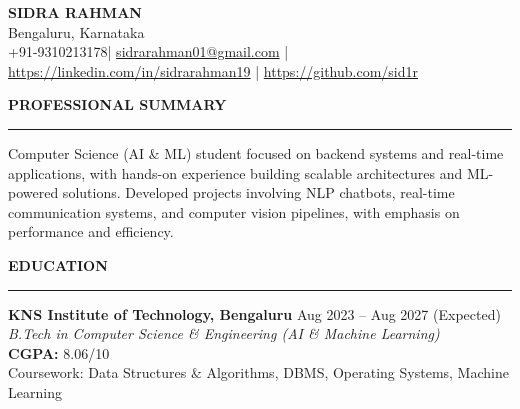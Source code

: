 \documentclass[11pt]{article}
\makeatletter
\newcommand{\Name}{SIDRA RAHMAN}
\newcommand{\Location}{Bengaluru, Karnataka}
\newcommand{\Phone}{+91-9310213178}
\newcommand{\Email}{sidrarahman01@gmail.com}
\newcommand{\LinkedIn}{https://linkedin.com/in/sidrarahman19}
\newcommand{\GitHub}{https://github.com/sid1r}
\renewcommand{\section}[1]{
  \par\vspace{3pt}
  {\large\textbf{#1}}
  \vspace{2pt}
  \hrule
  \vspace{4pt}
}
\makeatother
\begin{document}
\begin{center}
\textbf{\Large \Name} \\
\vspace{1pt}
\Location \\
\vspace{1pt}
\Phone \;|\; 
\href{mailto:\Email}{\Email} \;|\; 
\href{\LinkedIn}{\LinkedIn} \;|\; 
\href{\GitHub}{\GitHub}
\end{center}
\vspace{2pt}
\section{PROFESSIONAL SUMMARY}
Computer Science (AI \& ML) student focused on backend systems and real-time applications, with hands-on experience building scalable architectures and ML-powered solutions. Developed projects involving NLP chatbots, real-time communication systems, and computer vision pipelines, with emphasis on performance and efficiency.
\section{EDUCATION}
\textbf{KNS Institute of Technology, Bengaluru} \hfill Aug 2023 -- Aug 2027 (Expected) \\
\textit{B.Tech in Computer Science \& Engineering (AI \& Machine Learning)} \\
\textbf{CGPA:} 8.06/10 \\
Coursework: Data Structures \& Algorithms, DBMS, Operating Systems, Machine Learning
\end{document}
